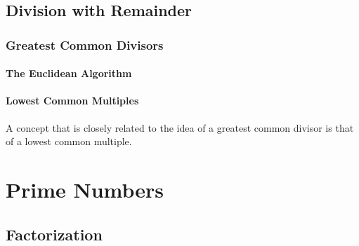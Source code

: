 
\subsection{Division with Remainder}

\subsubsection{Greatest Common Divisors}
\paragraph{The Euclidean Algorithm}
\paragraph{Lowest Common Multiples}
A concept that is closely related to the idea of a greatest common divisor is that of a lowest common multiple.

\section{Prime Numbers}

\subsection{Factorization}